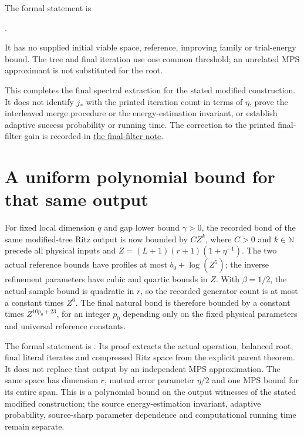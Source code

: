 \documentclass{article}
\begin{document}
The formal statement is

\noindent{}.\par
It has no supplied initial viable space, reference, improving family or
trial-energy bound. The tree and final iteration use one common threshold;
an unrelated MPS approximant is not substituted for the root.

This completes the final spectral extraction for the stated modified
construction. It does not identify $j_*$ with the printed iteration
count in terms of $\eta$, prove the interleaved merge procedure or the
energy-estimation invariant, or establish adaptive success probability
or running time. The correction to the printed final-filter gain is
recorded in
\href{https://sirui-lu.com/TNLean/paper-gaps/alvv16_final_filter_gain.pdf}{the final-filter note}.

\section*{A uniform polynomial bound for that same output}

For fixed local dimension $q$ and gap lower bound $\gamma>0$, the
recorded bond of the same modified-tree Ritz output is now bounded by
$CZ^k$, where $C>0$ and $k\in\mathbb N$ precede all physical inputs and
$Z=(L+1)(r+1)(1+\eta^{-1})$. The two actual reference bounds have
profiles at most $b_0+\log(Z^5)$; the inverse refinement parameters have
cubic and quartic bounds in $Z$. With $\beta=1/2$, the actual sample
bound is quadratic in $r$, so the recorded generator count is at most
a constant times $Z^6$. The final natural bond is therefore bounded
by a constant times $Z^{10p_0+23}$, for an integer $p_0$ depending only
on the fixed physical parameters and universal reference constants.

The formal statement is
.
Its proof extracts the actual operation, balanced root, final literal
iterates and compressed Ritz space from the explicit parent theorem.
It does not replace that output by an independent MPS approximation.
The same space has dimension $r$, mutual error parameter $\eta/2$ and
one MPS bound for its entire span. This is a polynomial bound on the
output witnesses of the stated modified construction; the source
energy-estimation invariant, adaptive probability, source-sharp
parameter dependence and computational running time remain separate.
\end{document}
